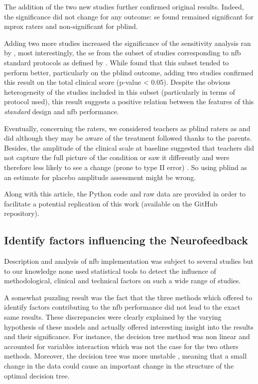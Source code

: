 The addition of the two new studies \citep{Strehl2017, Baumeister2016} further confirmed original results. Indeed, 
the significance did not change for any outcome: \gls{se} found remained significant for \gls{mprox} raters and 
non-significant for \gls{pblind}. 

Adding two more studies increased the significance of the sensitivity analysis ran by \citeauthor{Cortese2016}, 
most interestingly, the \gls{se} from the subset of studies corresponding to \gls{nfb} standard protocols as 
defined by \citet{Arns2014}. While \citeauthor{Cortese2016} found that this subset tended to perform better, particularly
on the \gls{pblind} outcome, adding two studies confirmed this result on the total clinical score (p-value < 0.05). 
Despite the obvious heterogeneity of the studies included in this subset (particularly in terms of protocol used), 
this result suggests a positive relation between the features of this \emph{standard} design and \gls{nfb} performance.

Eventually, concerning the raters, we considered teachers as \gls{pblind} raters as \citeauthor{Cortese2016} and 
\citeauthor{Micoulaud2014} did although they may be aware of the treatment followed thanks to the parents. 
Besides, the amplitude of the clinical scale at baseline suggested that teachers did not capture the full picture of 
the condition or saw it differently and were therefore less likely to see a change (prone to type II error) \citep{Sollie2013, Narad2015, Minder2018}.
So using \gls{pblind} as an estimate for placebo amplitude assessment might be wrong.

Along with this article, the Python code and raw data are provided in order to facilitate a potential replication of this work
(available on the GitHub repository).  


\subsection{Identify factors influencing the Neurofeedback}

Description and analysis of \gls{nfb} implementation was subject to several studies \citep{Arns2014, Enriquez2017, Vernon2004, Jeunet2018} 
but to our knowledge none used statistical tools to detect the influence of methodological, clinical and technical factors 
on such a wide range of studies. 

A somewhat puzzling result was the fact that the three methods which offered to identify factors contributing to the \gls{nfb} 
performance did not lead to the exact same results. These discrepancies were clearly explained by the varying hypothesis 
of these models and actually offered interesting insight into the results and their significance. For instance, the decision tree method was non 
linear and accounted for variables interaction which was not the case for the two others methods. Moreover, the decision tree was more unstable 
\citep{dwyer2007}, meaning that a small change in the data could cause an important change in the structure of the optimal decision tree.

